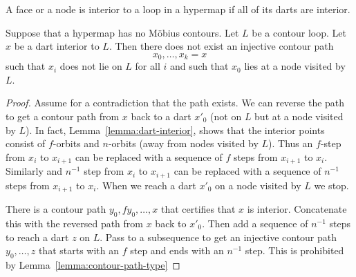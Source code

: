 \begin{definition}  A face or a node is interior to a
loop in a hypermap if all of its darts are interior.
\end{definition}

\begin{lemma}
Suppose that a hypermap has no M\"obius contours.  Let $L$ be a contour loop.
Let $x$ be a dart interior to $L$.  Then there does not exist an injective contour path
$$x_0,\ldots,x_k=x$$
such that $x_i$ does not lie on $L$ for all $i$ and such that $x_0$ lies at a node
visited by $L$.
\end{lemma}

\begin{proof} Assume for a contradiction that the path exists. 
We can reverse the path to get a contour path from $x$ back to a dart $x'_0$ (not on $L$ but at a node
visited by $L$).  In fact, Lemma~\ref{lemma:dart-interior}, shows that the interior points consist of $f$-orbits
and $n$-orbits (away from nodes visited by $L$).  Thus an $f$-step from $x_i$ to $x_{i+1}$ can be replaced
with a sequence of $f$ steps from $x_{i+1}$ to $x_i$.  Similarly and $n^{-1}$ step from $x_i$ to $x_{i+1}$
can be replaced with a sequence of $n^{-1}$ steps from $x_{i+1}$ to $x_i$.  When we reach a dart $x'_0$ on a node
visited by $L$ we stop.  

There is a contour path $y_0,f y_0,\ldots,x$ that certifies that $x$ is interior.  Concatenate this
with the reversed path from $x$ back to $x'_0$.  Then add a sequence of $n^{-1}$ steps to reach a dart $z$
on $L$.  Pass to a subsequence to get an injective contour path $y_0,\ldots,z$ that starts with an $f$ step
and ends with an $n^{-1}$ step.  This is prohibited by Lemma~\ref{lemma:contour-path-type} 
\end{proof}



